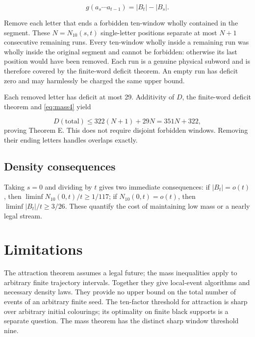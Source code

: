 \documentclass[
  11pt,
]{article}
\begin{document}
\begin{equation}\label{eq:mass4}
g(a_s\cdots a_{t-1})=|B_t|-|B_s|.
\end{equation}

Remove each letter that ends a forbidden ten-window wholly contained in
the segment. These $N=N_{10}(s,t)$ single-letter positions separate at most
$N+1$ consecutive remaining runs. Every ten-window wholly inside a
remaining run was wholly inside the original segment and cannot be
forbidden: otherwise its last position would have been removed. Each run
is a genuine physical subword and is therefore covered by the finite-word deficit theorem. An
empty run has deficit zero and may harmlessly be charged the same upper
bound.

Each removed letter has deficit at most 29. Additivity of $D$, the finite-word deficit theorem
and \eqref{eq:mass4} yield

\[
D(\text{total})\le322(N+1)+29N=351N+322,
\]
proving Theorem E. This does not require disjoint forbidden windows.
Removing their ending letters handles overlaps exactly.

\subsection{Density consequences}\label{density-consequences}

Taking \(s=0\) and dividing by \(t\) gives two immediate consequences:
if \(|B_t|=o(t)\), then \(\liminf N_{10}(0,t)/t\ge1/117\); if
\(N_{10}(0,t)=o(t)\), then \(\liminf |B_t|/t\ge3/26\). These quantify
the cost of maintaining low mass or a nearly legal stream.









\section{Limitations}
The attraction theorem assumes a legal future; the mass inequalities apply
to arbitrary finite trajectory intervals. Together they give local-event
algorithms and necessary density laws. They provide no upper bound on the
total number of events of an arbitrary finite seed. The ten-factor threshold
for attraction is sharp over arbitrary initial colourings; its optimality
on finite black supports is a separate question. The mass theorem has the
distinct sharp window threshold nine.
\end{document}
